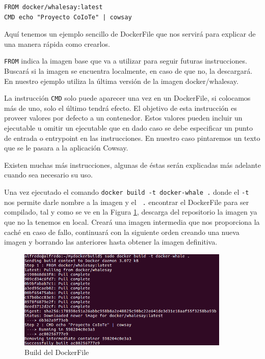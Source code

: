 \begin{lstlisting}[style=Bash]
FROM docker/whalesay:latest
CMD echo "Proyecto CoIoTe" | cowsay
\end{lstlisting}

Aquí tenemos un ejemplo sencillo de DockerFile que nos servirá para explicar de una manera rápida como crearlos. 

\texttt{FROM} indica la imagen base que va a utilizar para seguir futuras instrucciones. Buscará si la imagen se encuentra localmente, en caso de que no, la descargará. En nuestro ejemplo utiliza la última versión de la imagen docker/whalesay.

La instrucción \texttt{CMD} solo puede aparecer una vez en un DockerFile, si colocamos más de uno, solo el último tendrá efecto. El objetivo de esta instrucción es proveer valores por defecto a un contenedor. Estos valores pueden incluir un ejecutable u omitir un ejecutable que en dado caso se debe especificar un punto de entrada o entrypoint en las instrucciones. En nuestro caso pintaremos un texto que se le pasara a la aplicación Cowsay.

Existen muchas más instrucciones, algunas de éstas serán explicadas más adelante cuando sea necesario su uso. 

Una vez ejecutado el comando \texttt{docker build -t docker-whale .} donde el \texttt{-t} nos permite darle nombre a la imagen y el \texttt{ .} encontrar el DockerFile para ser compilado, tal y como se ve en la Figura \ref{Build:BuildDockerFile}, descarga del repositorio la imagen ya que no la tenemos en local. Creará una imagen intermedia que nos proporciona la caché en caso de fallo, continuará con la siguiente orden creando una nueva imagen y borrando las anteriores hasta obtener la imagen definitiva. 
 
\begin{figure}[htb]
\begin{center}
\includegraphics[width=0.90\textwidth]{./setup/DockerBuildWale}
\caption{Build del DockerFile}
\label{Build:BuildDockerFile}
\end{center}
\end{figure}
 
